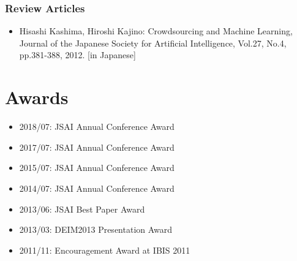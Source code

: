 \documentclass[a4paper,9pt]{article}
\begin{document}
\subsubsection*{Review Articles}
\begin{itemize}
 \item Hisashi Kashima, Hiroshi Kajino: Crowdsourcing and Machine Learning, Journal of the Japanese Society for Artificial Intelligence, Vol.27, No.4, pp.381-388, 2012. [in Japanese]
\end{itemize}


\section*{Awards}
\begin{itemize}
 \item 2018/07: JSAI Annual Conference Award
 \item 2017/07: JSAI Annual Conference Award
 \item 2015/07: JSAI Annual Conference Award
 \item 2014/07: JSAI Annual Conference Award
 \item 2013/06: JSAI Best Paper Award
 \item 2013/03: DEIM2013 Presentation Award
 \item 2011/11: Encouragement Award at IBIS 2011
\end{itemize}
\end{document}
